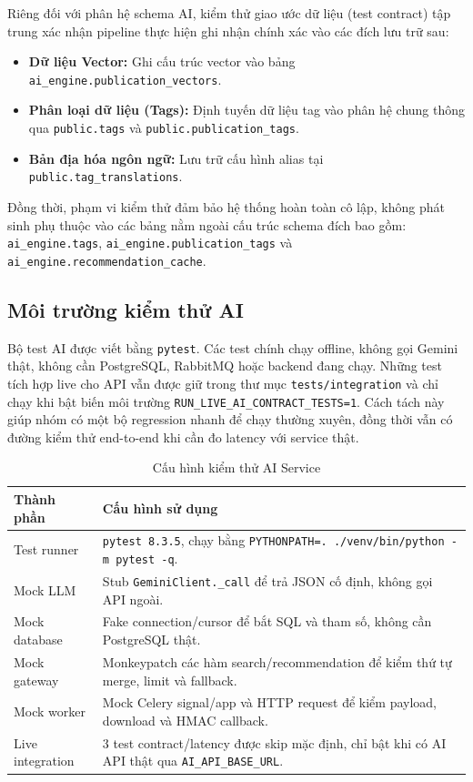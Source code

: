 Riêng đối với phân hệ schema AI, kiểm thử giao ước dữ liệu (test contract) tập trung xác nhận pipeline thực hiện ghi nhận chính xác vào các đích lưu trữ sau:
\begin{itemize}
    \item \textbf{Dữ liệu Vector:} Ghi cấu trúc vector vào bảng \texttt{ai\_engine.publication\_vectors}.
    \item \textbf{Phân loại dữ liệu (Tags):} Định tuyến dữ liệu tag vào phân hệ chung thông qua \texttt{public.tags} và \texttt{public.publication\_tags}.
    \item \textbf{Bản địa hóa ngôn ngữ:} Lưu trữ cấu hình alias tại \texttt{public.tag\_translations}.
\end{itemize}
Đồng thời, phạm vi kiểm thử đảm bảo hệ thống hoàn toàn cô lập, không phát sinh phụ thuộc vào các bảng nằm ngoài cấu trúc schema đích bao gồm: \texttt{ai\_engine.tags}, \texttt{ai\_engine.publication\_tags} và \texttt{ai\_engine.recommendation\_cache}.

\subsection{Môi trường kiểm thử AI}

Bộ test AI được viết bằng \texttt{pytest}. Các test chính chạy offline, không gọi
Gemini thật, không cần PostgreSQL, RabbitMQ hoặc backend đang chạy. Những test
tích hợp live cho API vẫn được giữ trong thư mục \texttt{tests/integration} và
chỉ chạy khi bật biến môi trường \texttt{RUN\_LIVE\_AI\_CONTRACT\_TESTS=1}.
Cách tách này giúp nhóm có một bộ regression nhanh để chạy thường xuyên, đồng
thời vẫn có đường kiểm thử end-to-end khi cần đo latency với service thật.

\begin{table}[H]
\centering
\small
\begin{tabularx}{\textwidth}{|p{4cm}|X|}
\hline
\textbf{Thành phần} & \textbf{Cấu hình sử dụng} \\
\hline
Test runner & \texttt{pytest 8.3.5}, chạy bằng \texttt{PYTHONPATH=. ./venv/bin/python -m pytest -q}. \\
\hline
Mock LLM & Stub \texttt{GeminiClient.\_call} để trả JSON cố định, không gọi API ngoài. \\
\hline
Mock database & Fake connection/cursor để bắt SQL và tham số, không cần PostgreSQL thật. \\
\hline
Mock gateway & Monkeypatch các hàm search/recommendation để kiểm thứ tự merge, limit và fallback. \\
\hline
Mock worker & Mock Celery signal/app và HTTP request để kiểm payload, download và HMAC callback. \\
\hline
Live integration & 3 test contract/latency được skip mặc định, chỉ bật khi có AI API thật qua \texttt{AI\_API\_BASE\_URL}. \\
\hline
\end{tabularx}
\caption{Cấu hình kiểm thử AI Service}
\label{tab:ai_test_env}
\end{table}



